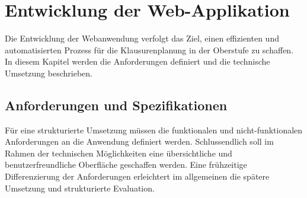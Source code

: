 \newpage
\section{Entwicklung der Web-Applikation}
Die Entwicklung der Webanwendung verfolgt das Ziel, einen effizienten und automatisierten Prozess für die Klausurenplanung in der Oberstufe zu schaffen. In diesem Kapitel werden die Anforderungen definiert und die technische Umsetzung beschrieben.
\subsection{Anforderungen und Spezifikationen}
Für eine strukturierte Umsetzung müssen die funktionalen und nicht-funktionalen Anforderungen an die Anwendung definiert werden. Schlussendlich soll im Rahmen der technischen Möglichkeiten eine übersichtliche und benutzerfreundliche Oberfläche geschaffen werden. Eine frühzeitige Differenzierung der Anforderungen erleichtert im allgemeinen die spätere Umsetzung und strukturierte Evaluation.
